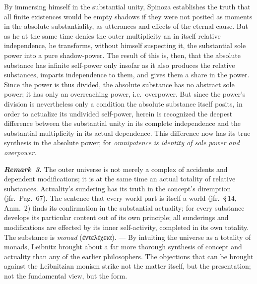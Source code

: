 \documentclass[12pt]{book}
\newcommand{\anm}[1]{\emph{\textbf{Remark~#1.}}}
\begin{document}
By immersing himself in the substantial unity, Spinoza establishes the truth
that all finite existences would be empty shadows if they were not posited
as moments in the absolute substantiality, as utterances and effects of the
eternal cause. But as he at the same time denies the outer multiplicity an
in itself relative independence, he transforms, without himself suspecting
it, the substantial sole power into a pure shadow-power. The result of this
is, then, that the absolute substance has infinite self-power only insofar
as it also produces the relative substances, imparts independence to them,
and gives them a share in the power. Since the power is thus divided, the
absolute substance has no abstract sole power; it has only an overreaching
power, i.e.\ overpower. But since the power's division is nevertheless only
a condition the absolute substance itself posits, in order to actualize its
undivided self-power, herein is recognized the deepest difference between
the substantial unity in its complete independence and the substantial
multiplicity in its actual dependence. This difference now has its true
synthesis in the absolute power; for \emph{omnipotence is identity of sole
power and overpower}.

\anm{3} The outer universe is not merely a complex of accidents and
dependent modifications; it is at the same time an actual totality of
relative substances. Actuality's sundering has its truth in the concept's
diremption (jfr.\ Pag.\ 67). The sentence that every world-part is itself a
world (jfr.\ \S\,14, Anm.\ 2) finds its confirmation in the substantial
actuality; for every substance develops its particular content out of its
own principle; all sunderings and modifications are effected by its inner
self-activity, completed in its own totality. The substance is \emph{monad}
(ἐντελέχεια). --- By intuiting the universe as a totality of monads,
Leibnitz brought about a far more thorough synthesis of concept and
actuality than any of the earlier philosophers. The objections that can be
brought against the Leibnitzian monism strike not the matter itself, but the
presentation; not the fundamental view, but the form.
\end{document}
